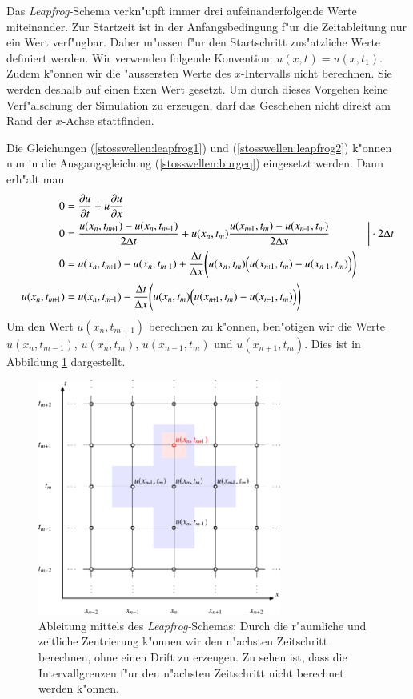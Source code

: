 \begin{refsection}
Das \textit{Leapfrog-}Schema verkn"upft immer drei aufeinanderfolgende
Werte miteinander. Zur Startzeit ist in der Anfangsbedingung f"ur die
Zeitableitung nur ein Wert verf"ugbar. Daher m"ussen f"ur den Startschritt
zus"atzliche  Werte  definiert werden. Wir verwenden folgende Konvention:
$u(x,t_{})=u(x,t_{1})$. Zudem k"onnen wir die "aussersten Werte des
$x$-Intervalls nicht berechnen. Sie werden deshalb auf einen fixen Wert
gesetzt. Um durch dieses Vorgehen keine Verf"alschung der Simulation
zu erzeugen, darf das Geschehen nicht direkt am Rand der $x$-Achse
stattfinden. 

Die Gleichungen (\ref{stosswellen:leapfrog1}) und
(\ref{stosswellen:leapfrog2}) k"onnen nun in die Ausgangsgleichung
(\ref*{stosswellen:burgeq}) eingesetzt werden. Dann erh"alt man
\begin{align}
	0 &= \frac{\partial u}{\partial t} + u\frac{\partial u}{\partial x} \notag 	 \\
	0 &= \frac{u(x_{n},t_{m\!+\!1})-u(x_{n},t_{m\!-\!1})}{2\Delta t} + u(x_{n},t_{m}) \frac{u(x_{n\!+\!1},t_{m})-u(x_{n\!-\!1},t_{m})}{2\Delta x} \quad &\bigg| \cdot 2\Delta t \notag \\
	0 &= u(x_{n},t_{m\!+\!1})-u(x_{n},t_{m\!-\!1}) +\frac{\Delta t}{\Delta x}\Bigg( u(x_{n},t_{m}) \Big(u(x_{n\!+\!1},t_{m})-u(x_{n\!-\!1},t_{m})\Big) \Bigg) \notag \\
	u(x_{n},t_{m\!+\!1}) &= u(x_{n},t_{m\!-\!1}) -\frac{\Delta t}{\Delta x}\Bigg( u(x_{n},t_{m}) \Big(u(x_{n\!+\!1},t_{m})-u(x_{n\!-\!1},t_{m})\Big) \Bigg)
	\label{stosswellen:unext}
\end{align}
Um den Wert $u(x_{n},t_{m\!+\!1})$ berechnen zu k"onnen,
ben"otigen wir die Werte $u(x_{n},t_{m\!-\!1})$, $u(x_{n},t_{m})$,
$u(x_{n\!-\!1},t_{m})$ und $u(x_{n\!+\!1},t_{m})$. Dies ist in Abbildung
\ref{stosswellen:leapfrog} dargestellt.
\begin{figure}
\begin{center}
	\includegraphics[width=8cm]{stosswellen/stoss-1.pdf}
\end{center}
\caption{Ableitung mittels des \textit{Leapfrog-}Schemas: Durch
die r"aumliche und zeitliche Zentrierung k"onnen wir den n"achsten
Zeitschritt berechnen, ohne einen Drift zu erzeugen. Zu sehen ist, dass
die Intervallgrenzen f"ur den n"achsten Zeitschritt nicht berechnet
werden k"onnen. 
\label{stosswellen:leapfrog}}
\end{figure}




\end{refsection}
